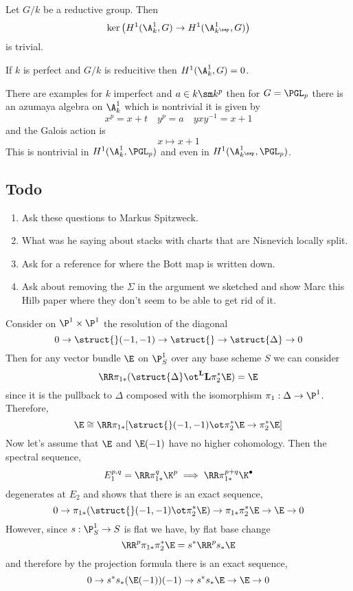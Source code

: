 \documentclass{article}
\newcommand{\LL}{\mathbf{L}}
\begin{document}
\begin{theorem}
Let $G / k$ be a reductive group. Then
\[ \ker{\left( H^1(\A^1_k, G) \to H^1(\A^1_{k^{\sep}}, G) \right) } \]
is trivial.
\end{theorem}

\begin{cor}
If $k$ is perfect and $G / k$ is reducitive then $H^1(\A^1_k, G) = 0$. 
\end{cor}

\begin{rmk}
There are examples for $k$ imperfect and $a \in k \sm k^p$ then for $G = \PGL_p$ there is an azumaya algebra on $\A^1_k$ which is nontrivial it is given by
\[ x^p = x + t \quad y^p = a \quad y x y^{-1} = x + 1 \]
and the Galois action is
\[ x \mapsto x + 1 \]
This is nontrivial in $H^1(\A^1_k, \PGL_p)$ and even in $H^1(\A^1_{k^{\sep}} , \PGL_p)$. 
\end{rmk}

\subsection{Todo}

\begin{enumerate}
\item 
Ask these questions to Markus Spitzweck. 

\item What was he saying about stacks with charts that are Nisnevich locally split. 

\item Ask for a reference for where the Bott map is written down.

\item Ask about removing the $\Sigma$ in the argument we sketched and show Marc this Hilb paper where they don't seem to be able to get rid of it.
\end{enumerate}

Consider on $\P^1 \times \P^1$ the resolution of the diagonal
\[ 0 \to \struct{}(-1,-1) \to \struct{} \to \struct{\Delta} \to 0 \]
Then for any vector bundle $\E$ on $\P^1_S$ over any base scheme $S$ we can consider
\[ \RR \pi_{1*} (\struct{\Delta} \ot^{\LL} \LL \pi_2^* \E) = \E \]
since it is the pullback to $\Delta$ composed with the isomorphism $\pi_1 : \Delta \to \P^1$. Therefore, 
\[ \E \cong \RR \pi_{1*} [\struct{}(-1,-1) \ot \pi_2^* \E \to \pi_2^* \E] \] 
Now let's assume that $\E$ and $\E(-1)$ have no higher cohomology. Then the spectral sequence,
\[ E^{p,q}_1 = \RR \pi_{1*}^q \K^p \implies \RR \pi_{1*}^{p+q} \K^\bullet \]
degenerates at $E_2$ and shows that there is an exact sequence,
\[ 0 \to \pi_{1*} (\struct{}(-1,-1) \ot \pi_2^* \E) \to \pi_{1*} \pi_{2}^* \E \to \E \to 0 \]
However, since $s : \P^1_S \to S$ is flat we have, by flat base change
\[ \RR^p \pi_{1*} \pi_{2}^* \E = s^* \RR^p s_* \E \]
and therefore by the projection formula there is an exact sequence,
\[ 0 \to s^* s_*(\E(-1))(-1) \to s^* s_* \E \to \E \to 0 \]
\end{document}
